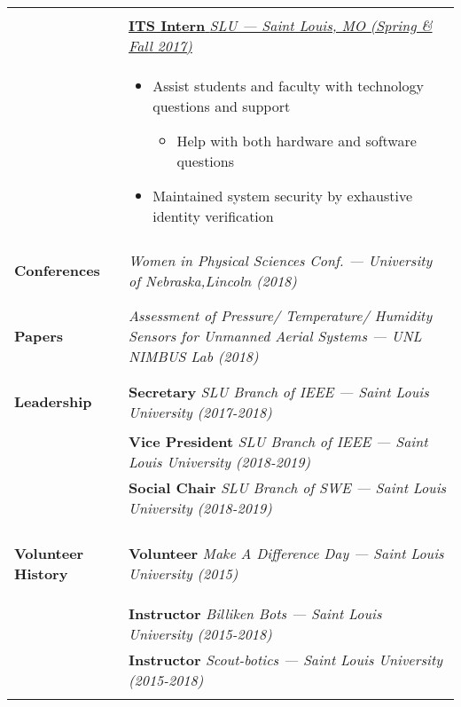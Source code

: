 \documentclass[11pt]{article}
\begin{document}
\begin{tabularx}{\textwidth}{|l|X|}
\begin{itemize}
		\end{itemize}\\
		& \uline{\textbf{ITS Intern} \hfill \footnotesize{\textit{SLU --- Saint Louis, MO (Spring \& Fall 2017)}}}\\
		&\vspace{-0.7\topsep}\begin{itemize}[noitemsep, nolistsep]
			\item Assist students and faculty with technology questions and support
			\begin{itemize}[noitemsep, nolistsep]
				\item Help with both hardware and software questions
			\end{itemize}
			\item Maintained system security by exhaustive identity verification
		\end{itemize} \\
		\begin{large}\textbf{Conferences}\end{large}
		& \footnotesize{\textit{Women in Physical Sciences Conf. --- University of Nebraska,Lincoln (2018)}} \\&\\
		\begin{large}\textbf{Papers}\end{large}
		& \footnotesize{\textit{Assessment of Pressure/ Temperature/ Humidity Sensors for
Unmanned Aerial Systems --- UNL NIMBUS Lab (2018)}} \\&\\
		\begin{large}\textbf{Leadership}\end{large}
		& \textbf{Secretary} \hfill \footnotesize{\textit{SLU Branch of IEEE --- Saint Louis University (2017-2018)}} \\
		& \textbf{Vice President} \hfill \footnotesize{\textit{SLU Branch of IEEE --- Saint Louis University (2018-2019)}} \\
		& \textbf{Social Chair} \hfill \footnotesize{\textit{SLU Branch of SWE --- Saint Louis University (2018-2019)}} \\&\\
		\begin{large}\textbf{Volunteer History}\end{large} 
		& \textbf{Volunteer} \hfill \footnotesize{\textit{Make A Difference Day --- Saint Louis University (2015)}}\\
		& \textbf{Instructor} \hfill \footnotesize{\textit{Billiken Bots --- Saint Louis University (2015-2018)}}\\
		& \textbf{Instructor} \hfill \footnotesize{\textit{Scout-botics --- Saint Louis University (2015-2018)}} \\ & \\ \hline
	\end{tabularx}
\end{document}
